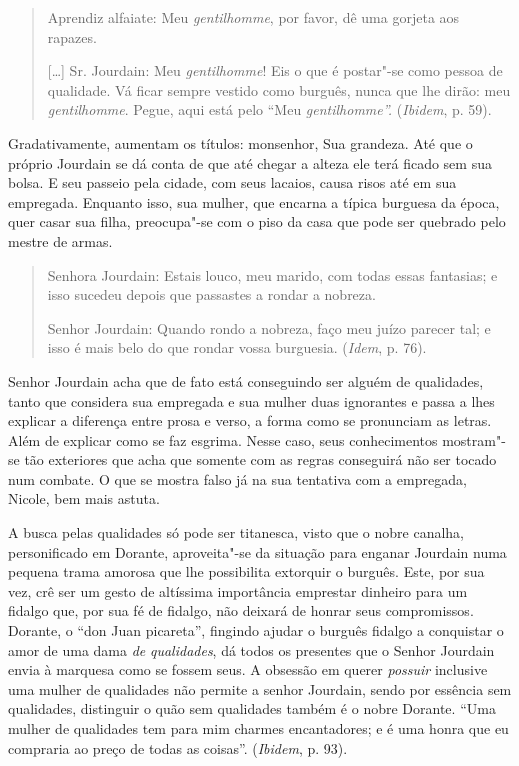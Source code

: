 \begin{quote}
Aprendiz alfaiate: Meu \emph{gentilhomme}, por favor, dê uma gorjeta aos
rapazes.

\noindent{}[\ldots{}] Sr. Jourdain: Meu \emph{gentilhomme}! Eis o que é postar"-se como pessoa
de qualidade. Vá ficar sempre vestido como burguês, nunca que lhe dirão:
meu \emph{gentilhomme}. Pegue, aqui está pelo ``Meu
\emph{gentilhomme''.} (\emph{Ibidem}, p. 59).
\end{quote}

Gradativamente, aumentam os títulos: monsenhor, Sua grandeza. Até que o
próprio Jourdain se dá conta de que até chegar a alteza ele terá ficado
sem sua bolsa. E seu passeio pela cidade, com seus lacaios, causa risos
até em sua empregada. Enquanto isso, sua mulher, que encarna a típica
burguesa da época, quer casar sua filha, preocupa"-se com o piso da casa
que pode ser quebrado pelo mestre de armas.

\begin{quote}
Senhora Jourdain: Estais louco, meu marido, com todas essas fantasias; e
isso sucedeu depois que passastes a rondar a nobreza.

\noindent{}Senhor Jourdain: Quando rondo a nobreza, faço meu juízo parecer tal; e
isso é mais belo do que rondar vossa burguesia. (\emph{Idem}, p. 76).
\end{quote}

Senhor Jourdain acha que de fato está conseguindo ser alguém de
qualidades, tanto que considera sua empregada e sua mulher duas
ignorantes e passa a lhes explicar a diferença entre prosa e verso, a
forma como se pronunciam as letras. Além de explicar como se faz
esgrima. Nesse caso, seus conhecimentos mostram"-se tão exteriores que
acha que somente com as regras conseguirá não ser tocado num combate. O
que se mostra falso já na sua tentativa com a empregada, Nicole, bem mais astuta.

A busca pelas qualidades só pode ser titanesca, visto que o nobre
canalha, personificado em Dorante, aproveita"-se da situação para enganar
Jourdain numa pequena trama amorosa que lhe possibilita extorquir o
burguês. Este, por sua vez, crê ser um gesto de altíssima importância
emprestar dinheiro para um fidalgo que, por sua fé de fidalgo, não
deixará de honrar seus compromissos. Dorante, o ``don Juan picareta'',
fingindo ajudar o burguês fidalgo a conquistar o amor de uma dama
\emph{de} \emph{qualidades}, dá todos os presentes que o Senhor Jourdain
envia à marquesa como se fossem seus. A obsessão em querer
\emph{possuir} inclusive uma mulher de qualidades não permite a senhor
Jourdain, sendo por essência sem qualidades, distinguir o quão sem
qualidades também é o nobre Dorante. ``Uma mulher de qualidades tem para
mim charmes encantadores; e é uma honra que eu compraria ao preço de
todas as coisas''. (\emph{Ibidem}, p. 93).

